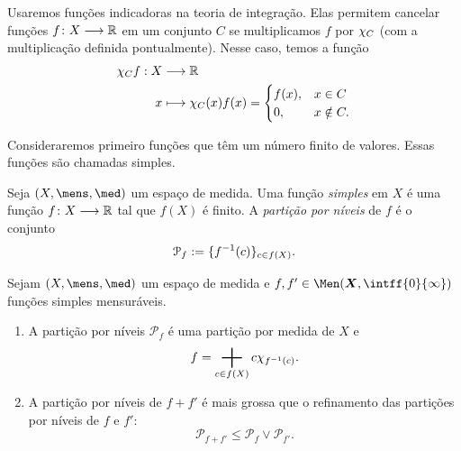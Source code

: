 
Usaremos funções indicadoras na teoria de integração. Elas permitem cancelar funções $f\colon X \longrightarrow \mathbb{R}$ em um conjunto $C$ se multiplicamos $f$ por $\chi_C$ (com a multiplicação definida pontualmente). Nesse caso, temos a função
	\begin{align*}
	{\chi_Cf}: {X} &\longrightarrow {\mathbb{R}} \\{x} &\longmapsto {\chi_C(x)f(x)=
		\begin{cases}
			f(x),& x \in C \\
			0,& x \notin C.
		\end{cases}
	}
	\end{align*}

Consideraremos primeiro funções que têm um número finito de valores. Essas funções são chamadas simples.

\begin{defi}
Seja $(X,\mens,\med)$ um espaço de medida. Uma função \emph{simples} em $X$ é uma função $f\colon X \longrightarrow \mathbb{R}$ tal que $f(X)$ é finito. A \emph{partição por níveis} de $f$ é o conjunto
	\begin{equation*}
	\mathcal P_f := \{f^{-1}(c)\}_{c \in f(X)}.
	\end{equation*}
\end{defi}

\begin{prop}
Sejam $(X,\mens,\med)$ um espaço de medida e $f,f' \in \Men(\bm X,\intff{0}{\infty})$ funções simples mensuráveis.
	\begin{enumerate}
	\item A partição por níveis $\mathcal P_f$ é uma partição por medida de $X$ e 
		\begin{equation*}
		f = \sum_{c \in f(X)} c \idc_{f\inv(c)}.
		\end{equation*}

	\item A partição por níveis de $f+f'$ é mais grossa que o refinamento das partições por níveis de $f$ e $f'$:
		\begin{equation*}
		\mathcal P_{f+f'} \leq \mathcal P_f \vee \mathcal P_{f'}.
		\end{equation*}
	\end{enumerate}
\end{prop}


